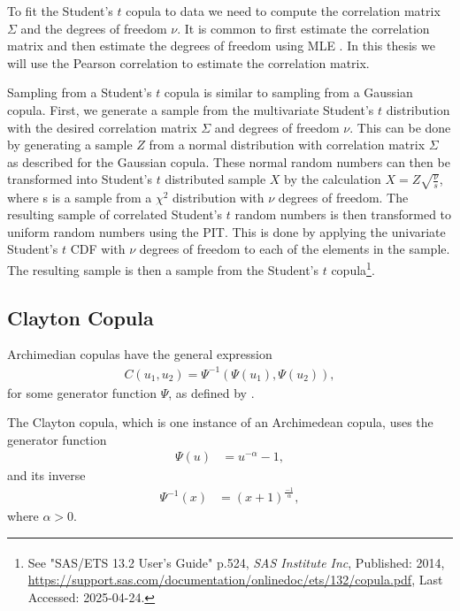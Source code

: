 \documentclass[%
a4paper,							
11pt,								
bibliography=totoc,						
abstracton=true					
]
{scrartcl}
\theoremstyle{plain}
\theoremstyle{definition}
\theoremstyle{remark}
\newcommand{\1}{\mathbbm{1}}
\begin{document}
To fit the Student's $t$ copula to data we need to compute the correlation matrix $\Sigma$ and the degrees of freedom $\nu$. It is common to first estimate the correlation matrix and then estimate the degrees of freedom using \gls{MLE} . In this thesis we will use the Pearson correlation to estimate the correlation matrix. 

Sampling from a Student's $t$ copula is similar to sampling from a Gaussian copula. First, we generate a sample from the multivariate Student's $t$ distribution with the desired correlation matrix $\Sigma$ and degrees of freedom $\nu$. This can be done by generating a sample $Z$ from a normal distribution with correlation matrix $\Sigma$ as described for the Gaussian copula. These normal random numbers can then be transformed into Student's $t$ distributed sample $X$ by the calculation $X = Z\sqrt{\frac{\nu}{s}} $, where s is a sample from a $\chi^2$ distribution with $\nu$ degrees of freedom. The resulting sample of correlated Student's $t$ random numbers is then transformed to uniform random numbers using the \gls{PIT}. This is done by applying the univariate Student's $t$ \gls{CDF} with $\nu$ degrees of freedom to each of the elements in the sample. The resulting sample is then a sample from the Student's $t$ copula\footnote{See "SAS/ETS\textsuperscript{\textregistered} 13.2 User's Guide" p.524, \textit{SAS Institute Inc}, Published: 2014, \url{https://support.sas.com/documentation/onlinedoc/ets/132/copula.pdf}, Last Accessed: 2025-04-24.}.


\subsection{Clayton Copula}\label{sec:ClaytonCopula}
Archimedian copulas have the general expression  
\begin{align*}
    C(u_1,u_2) = \Psi^{-1}(\Psi(u_1),\Psi(u_2)),
\end{align*}
for some generator function $\Psi$, as defined by .

The Clayton copula, which is one instance of an Archimedean copula, uses the generator function
\begin{align*}
    \Psi(u) &=u^{-\alpha}-1, 
\end{align*}
and its inverse
\begin{align*}
    \Psi^{-1}(x) &= (x+1)^{\frac{-1}{\alpha}},
\end{align*}
where $\alpha > 0$. 
\end{document}

